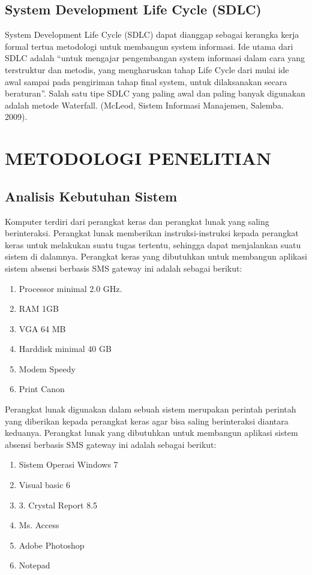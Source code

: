 \documentclass{jtetiproposalskripsi}
\begin{document}
\section{System Development Life Cycle (SDLC)}
System Development Life Cycle (SDLC) dapat dianggap sebagai kerangka kerja formal tertua metodologi untuk membangun system informasi. Ide utama dari SDLC adalah “untuk mengajar pengembangan system informasi dalam cara yang terstruktur dan metodis, yang mengharuskan tahap Life Cycle dari mulai ide awal sampai pada pengiriman tahap final system, untuk dilaksanakan secara beraturan”. Salah satu tipe SDLC yang paling awal dan paling banyak digunakan adalah metode Waterfall. (McLeod, Sistem Informasi Manajemen, Salemba. 2009).





\chapter{METODOLOGI PENELITIAN}

\section{Analisis Kebutuhan Sistem}
Komputer terdiri dari perangkat keras dan perangkat lunak yang saling berinteraksi. Perangkat lunak memberikan instruksi-instruksi kepada perangkat keras untuk melakukan suatu tugas tertentu, sehingga dapat menjalankan suatu sistem di dalamnya. Perangkat keras yang dibutuhkan untuk membangun aplikasi sistem absensi berbasis SMS gateway ini adalah sebagai berikut:
\begin{enumerate}
\item Processor minimal 2.0 GHz.
\item RAM 1GB
\item VGA 64 MB
\item Harddisk minimal 40 GB
\item Modem Speedy
\item Print Canon
\end{enumerate}

Perangkat lunak digunakan dalam sebuah sistem merupakan perintah perintah yang diberikan kepada perangkat keras agar bisa saling berinteraksi diantara keduanya. Perangkat lunak yang dibutuhkan untuk membangun aplikasi sistem absensi berbasis SMS gateway ini adalah sebagai berikut:
\begin{enumerate}
\item Sistem Operasi Windows 7
\item Visual basic 6
\item 3. Crystal Report 8.5
\item Ms. Access
\item Adobe Photoshop
\item Notepad
\end{enumerate}
\end{document}
